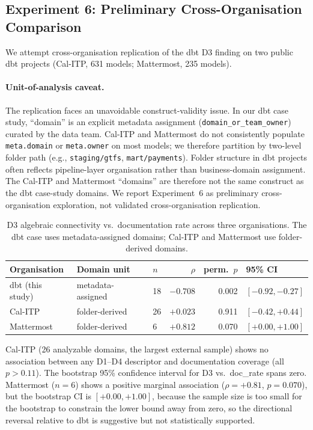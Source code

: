 \documentclass[11pt,a4paper]{article}
\begin{document}
\subsection{Experiment 6: Preliminary Cross-Organisation Comparison}

We attempt cross-organisation replication of the dbt D3 finding on two
public dbt projects (Cal-ITP, 631 models; Mattermost, 235 models).

\paragraph{Unit-of-analysis caveat.}
The replication faces an unavoidable construct-validity issue. In our
dbt case study, ``domain'' is an explicit metadata assignment
(\texttt{domain\_or\_team\_owner}) curated by the data team. Cal-ITP
and Mattermost do not consistently populate \texttt{meta.domain} or
\texttt{meta.owner} on most models; we therefore partition by two-level
folder path (e.g., \texttt{staging/gtfs}, \texttt{mart/payments}). Folder
structure in dbt projects often reflects pipeline-layer organisation
rather than business-domain assignment. The Cal-ITP and Mattermost
``domains'' are therefore not the same construct as the dbt case-study
domains. We report Experiment~6 as preliminary cross-organisation
exploration, not validated cross-organisation replication.

\begin{table}[htb]
\centering
\caption{D3 algebraic connectivity vs.\ documentation rate across three
  organisations. The dbt case uses metadata-assigned domains;
  Cal-ITP and Mattermost use folder-derived domains.}
\label{tab:crossorg}
\begin{tabular}{lllrrl}
\toprule
Organisation & Domain unit & $n$ & $\rho$ & perm.\ $p$ & 95\% CI \\
\midrule
dbt (this study) & metadata-assigned & 18 & $-0.708$ & 0.002 & $[-0.92, -0.27]$ \\
Cal-ITP & folder-derived & 26 & $+0.023$ & 0.911 & $[-0.42, +0.44]$ \\
Mattermost & folder-derived & 6 & $+0.812$ & 0.070 & $[+0.00, +1.00]$ \\
\bottomrule
\end{tabular}
\end{table}

Cal-ITP (26 analyzable domains, the largest external sample) shows no
association between any D1--D4 descriptor and documentation coverage
(all $p > 0.11$). The bootstrap 95\% confidence interval for D3 vs.\
doc\_rate spans zero. Mattermost ($n = 6$) shows a positive marginal
association ($\rho = +0.81$, $p = 0.070$), but the bootstrap CI is
$[+0.00, +1.00]$, because the sample size is too small for the bootstrap to
constrain the lower bound away from zero, so the directional reversal
relative to dbt is suggestive but not statistically supported.
\end{document}
